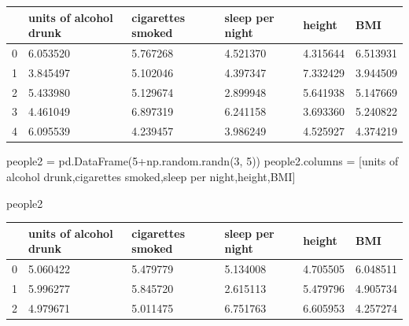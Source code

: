 \documentclass[
  letterpaper,
  DIV=11,
  numbers=noendperiod]{scrreprt}
\newenvironment{Shaded}{\begin{snugshade}}{\end{snugshade}}
\newcommand{\DecValTok}[1]{\textcolor[rgb]{0.68,0.00,0.00}{#1}}
\newcommand{\NormalTok}[1]{\textcolor[rgb]{0.00,0.23,0.31}{#1}}
\newcommand{\OperatorTok}[1]{\textcolor[rgb]{0.37,0.37,0.37}{#1}}
\newcommand{\StringTok}[1]{\textcolor[rgb]{0.13,0.47,0.30}{#1}}
\begin{document}
\begin{longtable}[]{@{}llllll@{}}
\toprule()
& units of alcohol drunk & cigarettes smoked & sleep per night & height
& BMI \\
\midrule()
\endhead
0 & 6.053520 & 5.767268 & 4.521370 & 4.315644 & 6.513931 \\
1 & 3.845497 & 5.102046 & 4.397347 & 7.332429 & 3.944509 \\
2 & 5.433980 & 5.129674 & 2.899948 & 5.641938 & 5.147669 \\
3 & 4.461049 & 6.897319 & 6.241158 & 3.693360 & 5.240822 \\
4 & 6.095539 & 4.239457 & 3.986249 & 4.525927 & 4.374219 \\
\bottomrule()
\end{longtable}

\begin{Shaded}
\begin{Highlighting}[]
\NormalTok{people2 }\OperatorTok{=}\NormalTok{ pd.DataFrame(}\DecValTok{5}\OperatorTok{+}\NormalTok{np.random.randn(}\DecValTok{3}\NormalTok{, }\DecValTok{5}\NormalTok{))}
\NormalTok{people2.columns }\OperatorTok{=}\NormalTok{ [}\StringTok{\textquotesingle{}units of alcohol drunk\textquotesingle{}}\NormalTok{,}\StringTok{\textquotesingle{}cigarettes smoked\textquotesingle{}}\NormalTok{,}\StringTok{\textquotesingle{}sleep per night\textquotesingle{}}\NormalTok{,}\StringTok{\textquotesingle{}height\textquotesingle{}}\NormalTok{,}\StringTok{\textquotesingle{}BMI\textquotesingle{}}\NormalTok{]}
\end{Highlighting}
\end{Shaded}

\begin{Shaded}
\begin{Highlighting}[]
\NormalTok{people2}
\end{Highlighting}
\end{Shaded}

\begin{longtable}[]{@{}llllll@{}}
\toprule()
& units of alcohol drunk & cigarettes smoked & sleep per night & height
& BMI \\
\midrule()
\endhead
0 & 5.060422 & 5.479779 & 5.134008 & 4.705505 & 6.048511 \\
1 & 5.996277 & 5.845720 & 2.615113 & 5.479796 & 4.905734 \\
2 & 4.979671 & 5.011475 & 6.751763 & 6.605953 & 4.257274 \\
\bottomrule()
\end{longtable}
\end{document}
